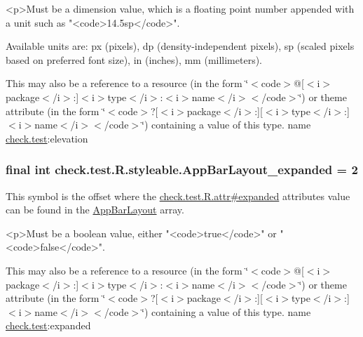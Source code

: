 \begin{DoxyVerb}      <p>Must be a dimension value, which is a floating point number appended with a unit such as "<code>14.5sp</code>".
\end{DoxyVerb}
 Available units are\+: px (pixels), dp (density-\/independent pixels), sp (scaled pixels based on preferred font size), in (inches), mm (millimeters). 

This may also be a reference to a resource (in the form \char`\"{}$<$code$>$@\mbox{[}$<$i$>$package$<$/i$>$\+:\mbox{]}$<$i$>$type$<$/i$>$\+:$<$i$>$name$<$/i$>$$<$/code$>$\char`\"{}) or theme attribute (in the form \char`\"{}$<$code$>$?\mbox{[}$<$i$>$package$<$/i$>$\+:\mbox{]}\mbox{[}$<$i$>$type$<$/i$>$\+:\mbox{]}$<$i$>$name$<$/i$>$$<$/code$>$\char`\"{}) containing a value of this type.  name \hyperlink{namespacecheck_1_1test}{check.\+test}\+:elevation \hypertarget{classcheck_1_1test_1_1_r_1_1styleable_a72cf6dabc14227ec4824c24626692296}{}
\subsubsection[{App\+Bar\+Layout\+\_\+expanded}]{\setlength{\rightskip}{0pt plus 5cm}final int check.\+test.\+R.\+styleable.\+App\+Bar\+Layout\+\_\+expanded = 2\hspace{0.3cm}{\ttfamily [static]}}\label{classcheck_1_1test_1_1_r_1_1styleable_a72cf6dabc14227ec4824c24626692296}
This symbol is the offset where the \hyperlink{classcheck_1_1test_1_1_r_1_1attr_a92c0bde20e9439237e08ad4232347c4a}{check.\+test.\+R.\+attr\#expanded} attribute\textquotesingle{}s value can be found in the \hyperlink{classcheck_1_1test_1_1_r_1_1styleable_ac38bda3bc57af07b7730c8f4a05b2049}{App\+Bar\+Layout} array.

\begin{DoxyVerb}      <p>Must be a boolean value, either "<code>true</code>" or "<code>false</code>".
\end{DoxyVerb}
 

This may also be a reference to a resource (in the form \char`\"{}$<$code$>$@\mbox{[}$<$i$>$package$<$/i$>$\+:\mbox{]}$<$i$>$type$<$/i$>$\+:$<$i$>$name$<$/i$>$$<$/code$>$\char`\"{}) or theme attribute (in the form \char`\"{}$<$code$>$?\mbox{[}$<$i$>$package$<$/i$>$\+:\mbox{]}\mbox{[}$<$i$>$type$<$/i$>$\+:\mbox{]}$<$i$>$name$<$/i$>$$<$/code$>$\char`\"{}) containing a value of this type.  name \hyperlink{namespacecheck_1_1test}{check.\+test}\+:expanded \hypertarget{classcheck_1_1test_1_1_r_1_1styleable_adbe27e505a2c53030b9f1cc91b81a452}{}
